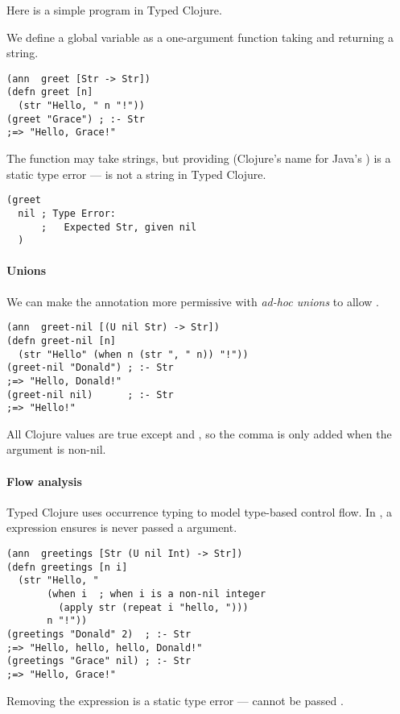 Here is a simple program in Typed Clojure.

We define a global variable  as a one-argument function
taking and returning a string.

\begin{verbatim}
(ann  greet [Str -> Str])
(defn greet [n]
  (str "Hello, " n "!"))
(greet "Grace") ; :- Str
;=> "Hello, Grace!"
\end{verbatim}

The function may take strings, but providing  (Clojure's name for Java's )
is a static type error ---  is not a string in Typed Clojure.

\begin{verbatim}
(greet 
  nil ; Type Error:
      ;   Expected Str, given nil
  )
\end{verbatim}

\paragraph{Unions} We can make the annotation more permissive with \emph{ad-hoc unions}
to allow .

\begin{verbatim}
(ann  greet-nil [(U nil Str) -> Str])
(defn greet-nil [n]
  (str "Hello" (when n (str ", " n)) "!"))
(greet-nil "Donald") ; :- Str
;=> "Hello, Donald!"
(greet-nil nil)      ; :- Str
;=> "Hello!"
\end{verbatim}

All Clojure values are true except  and , so the
comma is only added when the argument is non-nil.

\paragraph{Flow analysis} Typed Clojure uses occurrence typing to
model type-based control flow.
In , a  expression ensures 
is never passed a  argument.

\begin{verbatim}
(ann  greetings [Str (U nil Int) -> Str])
(defn greetings [n i]
  (str "Hello, "
       (when i  ; when i is a non-nil integer
         (apply str (repeat i "hello, ")))
       n "!"))
(greetings "Donald" 2)  ; :- Str
;=> "Hello, hello, hello, Donald!"
(greetings "Grace" nil) ; :- Str
;=> "Hello, Grace!"
\end{verbatim}

Removing the  expression is a static type error
---  cannot be passed .

